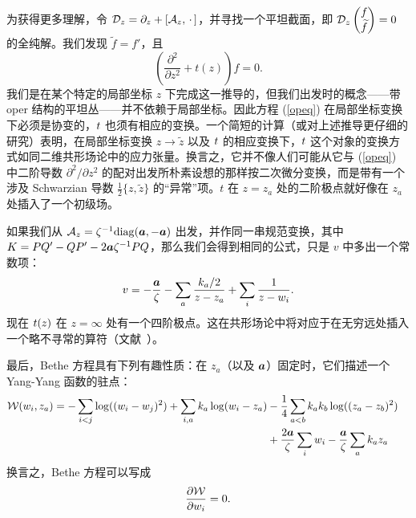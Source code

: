 为获得更多理解，令 ${\mathcal D}_z=\partial_z+[{\mathcal A}_z,\,\cdot\,]$，并寻找一个平坦截面，即 ${\mathcal D}_z\begin{pmatrix}f\cr \widetilde f\end{pmatrix}=0$ 的全纯解。我们发现 $\tilde f=f'$，且
\begin{equation}\label{opeq}\left(\frac{\partial^2}{\partial z^2} +t(z)\right)f = 0.\end{equation}
我们是在某个特定的局部坐标 $z$ 下完成这一推导的，但我们出发时的概念——带 oper 结构的平坦丛——并不依赖于局部坐标。因此方程 (\ref{opeq}) 在局部坐标变换下必须是协变的，${{t}}$ 也须有相应的变换。一个简短的计算（或对上述推导更仔细的研究）表明，在局部坐标变换 $z\to \tilde z$ 以及 ${{t}}$ 的相应变换下，${{t}}$ 这个对象的变换方式如同二维共形场论中的应力张量。换言之，它并不像人们可能从它与 (\ref{opeq}) 中二阶导数 $\partial^2/\partial z^2$ 的配对出发所朴素设想的那样按二次微分变换，而是带有一个涉及 Schwarzian 导数 $\frac{1}{2} \{z,\tilde z\}$ 的“异常”项。$t$ 在 $z=z_a$ 处的二阶极点就好像在 $z_a$ 处插入了一个初级场。


如果我们从 ${\mathcal A}_z = \zeta^{-1} \mathrm{diag}({\boldsymbol{a}},-{\boldsymbol{a}})$ 出发，并作同一串规范变换，其中 $K=PQ'-QP' - 2 {\boldsymbol{a}} \zeta^{-1} PQ$，那么我们会得到相同的公式，只是 $v$ 中多出一个常数项：
\begin{equation}\label{tomogro2}v=- \frac{{\boldsymbol{a}}}{\zeta}-\sum_a \frac{ k_a/2}
{z-z_a}+\sum_i\frac{1}{z-w_i}.\end{equation}
现在 ${{t}}(z)$ 在 $z=\infty$ 处有一个四阶极点。这在共形场论中将对应于在无穷远处插入一个略不寻常的算符（文献~\cite{G}）。


最后，Bethe 方程具有下列有趣性质：在 $z_a$（以及 ${\boldsymbol{a}}$）固定时，它们描述一个 Yang-Yang 函数的驻点：
\begin{align}\label{yy}
{\mathcal W}(w_i,z_a) = -  \sum_{i < j} \log((w_i - w_j)^2) + \sum_{i,a} k_a \log(w_i - z_a) & -
 \frac{1}{4} \sum_{a < b} k_a k_b \log( (z_a - z_b)^2) \cr & +\frac{2 {\boldsymbol{a}}}{\zeta} \sum_i w_i - \frac{{\boldsymbol{a}}}{\zeta} \sum_a k_az_a
\end{align}
换言之，Bethe 方程可以写成
\begin{equation}
\frac{\partial {\mathcal W}}{\partial w_i} =0.
\end{equation}

